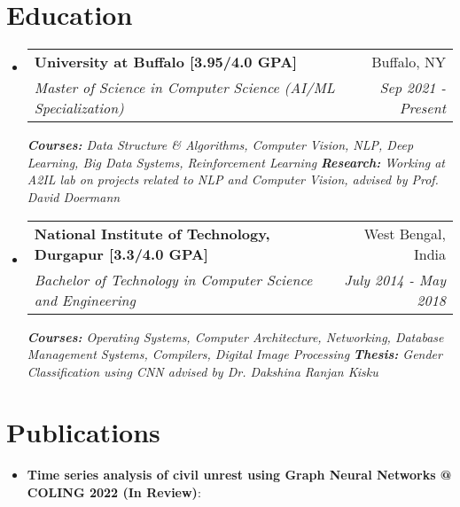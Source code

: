 \documentclass[a4paper,20pt]{article}
\makeatletter
\newcommand{\resumeItem}[2]{
  \item\small{
    \textbf{#1}{: #2 \vspace{-2pt}}
  }
}
\newcommand{\resumeSubheading}[4]{
  \vspace{-1pt}\item
    \begin{tabular*}{0.97\textwidth}{l@{\extracolsep{\fill}}r}
      \textbf{#1} & #2 \\
      \textit{#3} & \textit{#4} \\
    \end{tabular*}\vspace{-5pt}
}
\newcommand{\resumeSubItem}[2]{\resumeItem{#1}{#2}\vspace{-3pt}}
\newcommand{\resumeSubHeadingListStart}{\begin{itemize}[leftmargin=*]}
\newcommand{\resumeSubHeadingListEnd}{\end{itemize}}
\makeatother
\begin{document}
\section{Education}
  \resumeSubHeadingListStart
    \resumeSubheading
      {University at Buffalo [3.95/4.0 GPA] }{Buffalo, NY}
      {Master of Science in Computer Science (AI/ML Specialization)}{Sep 2021 - Present}
      {\scriptsize \textit{ \footnotesize{\newline{}\textbf{Courses:} Data Structure \& Algorithms, Computer Vision, NLP, Deep Learning, Big Data Systems, Reinforcement Learning}}}
      {\scriptsize \textit{ \footnotesize{\newline{}\textbf{Research:} Working at A2IL lab on projects related to NLP and Computer Vision, advised by Prof. David Doermann}}}
    \resumeSubHeadingListEnd
    
    \resumeSubHeadingListStart
    \resumeSubheading
      {National Institute of Technology, Durgapur [3.3/4.0 GPA]}{West Bengal, India}
      {Bachelor of Technology in Computer Science and Engineering}{July 2014 - May 2018}
      {\scriptsize \textit{ \footnotesize{\newline{}\textbf{Courses:} Operating Systems, Computer Architecture, Networking, Database Management Systems, Compilers, Digital Image Processing}}}
      {\scriptsize \textit{ \footnotesize{\newline{}\textbf{Thesis:} Gender Classification using CNN advised by Dr. Dakshina Ranjan Kisku}}}
    \resumeSubHeadingListEnd
	    
\vspace{-8pt}
\section{Publications}

\resumeSubHeadingListStart
\resumeSubItem{Time series analysis of civil unrest using Graph Neural Networks @ COLING 2022 (In Review)}{}
\vspace{2pt}
\resumeSubHeadingListEnd
\end{document}
